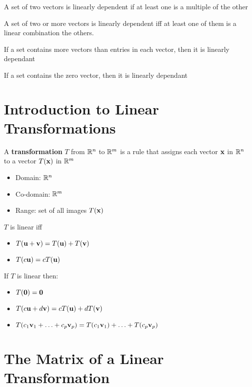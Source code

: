 \documentclass{report}
\begin{document}
A set of two vectors is linearly dependent if at least one is a multiple of the other

\begin{theorem}
    A set of two or more vectors is linearly dependent iff at least one of them is a linear combination the others.
\end{theorem}

\begin{theorem}
    If a set contains more vectors than entries in each vector, then it is linearly dependant 
\end{theorem}

\begin{theorem}
    If a set contains the zero vector, then it is linearly dependant 
\end{theorem}

\section{Introduction to Linear Transformations}

A \textbf{transformation} $T$ from $\mathbb{R}^n$ to $\mathbb{R}^m$ is a rule that assigns each vector $\mathbf{x}$ in 
$\mathbb{R}^n$ to a vector $T(\mathbf{x})$ in $\mathbb{R}^m$
\begin{itemize}
    \item Domain: $\mathbb{R}^n$
    \item Co-domain: $\mathbb{R}^m$
    \item Range: set of all images $T(\mathbf{x})$
\end{itemize}

\begin{definition}
    $T$ is linear iff \begin{itemize}
        \item $T(\mathbf{u} + \mathbf{v}) = T(\mathbf{u}) + T(\mathbf{v})$
        \item $T(c\mathbf{u}) = c T(\mathbf{u})$
    \end{itemize}
\end{definition}

If $T$ is linear then:
\begin{itemize}
    \item $T(\mathbf{0}) = \mathbf{0}$
    \item $T(c\mathbf{u} + d\mathbf{v}) = cT(\mathbf{u}) + dT(\mathbf{v})$
    \item $T(c_1\mathbf{v}_1 + \ldots + c_p\mathbf{v}_p) = T(c_1\mathbf{v}_1) + \ldots + T(c_p\mathbf{v}_p)$
\end{itemize}

\section{The Matrix of a Linear Transformation}
\end{document}
